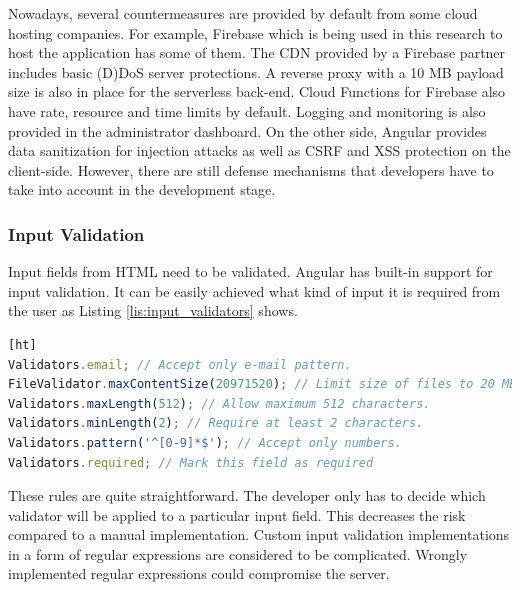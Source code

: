 \documentclass{article} %
\begin{document}
Nowadays, several countermeasures are provided by default from some cloud hosting companies. For example, Firebase which is being used in this research to host the application has some of them. The CDN provided by a Firebase partner includes basic (D)DoS server protections. A reverse proxy with a 10 MB payload size is also in place for the serverless back-end. Cloud Functions for Firebase also have rate, resource and time limits by default. Logging and monitoring is also provided in the administrator dashboard. On the other side, Angular provides data sanitization for injection attacks as well as CSRF and XSS protection on the client-side. However, there are still defense mechanisms that developers have to take into account in the development stage.
\subsubsection{Input Validation}
Input fields from HTML need to be validated. Angular has built-in support for input validation. It can be easily achieved what kind of input it is required from the user as Listing \ref{lis:input_validators} shows.
\begin{lstlisting}[language=JavaScript,firstnumber=1,label={lis:input_validators},caption={Input validators\index{Validation!input} in Angular\index{Angular}.}][ht]
Validators.email; // Accept only e-mail pattern.
FileValidator.maxContentSize(20971520); // Limit size of files to 20 MB.
Validators.maxLength(512); // Allow maximum 512 characters.
Validators.minLength(2); // Require at least 2 characters.
Validators.pattern('^[0-9]*$'); // Accept only numbers.
Validators.required; // Mark this field as required
\end{lstlisting}
These rules are quite straightforward. The developer only has to decide which validator will be applied to a particular input field. This decreases the risk compared to a manual implementation. Custom input validation implementations in a form of regular expressions are considered to be complicated. Wrongly implemented regular expressions could compromise the server.
\end{document}
